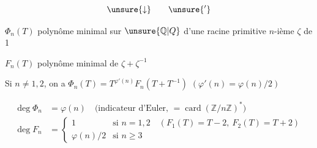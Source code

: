 

\[
\unsure{\downarrow}\qquad\unsure{'}
\]











$\Phi_n(T)$ polynôme minimal sur $\unsure{\mathbb Q|Q}$ d'une racine primitive $n$-ième $\zeta$ de 1


$F_n(T)$ polynôme minimal de $\zeta+\zeta^{-1}$

Si $n\ne1,2$, on a $\Phi_n(T)=T^{\varphi'(n)}F_n(T+T^{-1})$ \quad $(\varphi'(n)=\varphi(n)/2)$


\[
\begin{aligned}
\deg\Phi_n&=\varphi(n)\quad\text{(indicateur d'Euler, }=\operatorname{card}(\mathbb Z/n\mathbb Z)^*\text{)}\\
\deg F_n&=\begin{cases}1&\text{si }n=1,2\quad(F_1(T)=T-2,\ F_2(T)=T+2)\\
\varphi(n)/2&\text{si }n\geq3\end{cases}
\end{aligned}
\]

